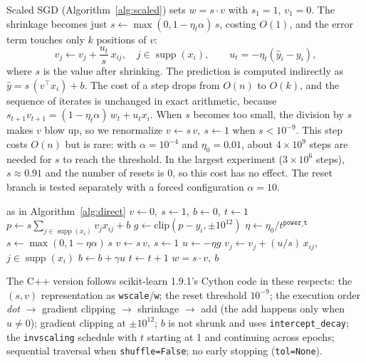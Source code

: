 \documentclass[10pt,a4paper,twocolumn]{article}
\newcommand{\x}{\times}
\newcommand{\supp}{\operatorname{supp}}
\begin{document}
Scaled SGD (Algorithm~\ref{alg:scaled}) sets $w=s\cdot v$ with $s_1=1$, $v_1=0$. The shrinkage becomes just $s\leftarrow\max(0,1-\eta_t\alpha)\,s$, costing $O(1)$, and the error term touches only $k$ positions of $v$:
\begin{equation}
v_j\leftarrow v_j+\frac{u_t}{s}\,x_{ij},\quad j\in\supp(x_i),\qquad u_t=-\eta_t(\hat y_i-y_i),
\label{eq:sv}
\end{equation}
where $s$ is the value after shrinking. The prediction is computed indirectly as $\hat y=s\,(v^\top x_i)+b$. The cost of a step drops from $O(n)$ to $O(k)$, and the sequence of iterates is unchanged in exact arithmetic, because $s_{t+1}v_{t+1}=(1-\eta_t\alpha)\,w_t+u_tx_i$. When $s$ becomes too small, the division by $s$ makes $v$ blow up, so we renormalize $v\leftarrow s\,v,\ s\leftarrow1$ when $s<10^{-9}$. This step costs $O(n)$ but is rare: with $\alpha=10^{-4}$ and $\eta_0=0.01$, about $4\x10^{9}$ steps are needed for $s$ to reach the threshold. In the largest experiment ($3\x10^6$ steps), $s\approx0.91$ and the number of resets is 0, so this cost has no effect. The reset branch is tested separately with a forced configuration $\alpha=10$.

\begin{algorithm}[!htb]
\caption{Scaled SGD, $w=s\cdot v$}\label{alg:scaled}
\small
\begin{algorithmic}[1]
\Require as in Algorithm~\ref{alg:direct}
\State $v\gets0,\ s\gets1,\ b\gets0,\ t\gets1$
  \State $p\gets s\sum_{j\in\supp(x_i)}v_jx_{ij}+b$
  \State $g\gets\mathrm{clip}(p-y_i,\pm10^{12})$
  \State $\eta\gets\eta_0/t^{\texttt{power\_t}}$
  \State $s\gets\max(0,1-\eta\alpha)\,s$ 
    \State $v\gets s\,v,\ s\gets1$ 
  \EndIf
  \State $u\gets-\eta g$
    \State $v_j\gets v_j+(u/s)\,x_{ij}$, $j\in\supp(x_i)$ 
    \State $b\gets b+\gamma u$
  \EndIf
  \State $t\gets t+1$
\EndFor
\State \Return $w=s\cdot v,\ b$ 
\end{algorithmic}
\end{algorithm}

The C++ version follows scikit-learn 1.9.1's Cython code in these respects: the $(s,v)$ representation as \texttt{wscale}/\texttt{w}; the reset threshold $10^{-9}$; the execution order \emph{dot} $\to$ gradient clipping $\to$ shrinkage $\to$ add (the add happens only when $u\neq0$); gradient clipping at $\pm10^{12}$; $b$ is not shrunk and uses \texttt{intercept\_decay}; the \texttt{invscaling} schedule with $t$ starting at 1 and continuing across epochs; sequential traversal when \texttt{shuffle=False}; no early stopping (\texttt{tol=None}).
\end{document}
